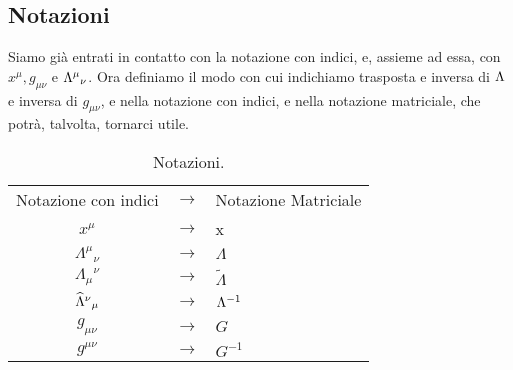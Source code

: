 \subsection{Notazioni}
Siamo gi\`a entrati in contatto con la notazione con indici, e,
assieme ad essa, con $x^{\mu},g_{\mu\nu}$ e $\Lambda^{\mu}{}_{\nu}$.
Ora definiamo il modo con cui indichiamo trasposta e inversa di $\Lambda$
e inversa di $g_{\mu\nu}$, e nella notazione con indici, e nella
notazione matriciale, che potr\`a, talvolta, tornarci utile.

\begin{table}[htbp]
\begin{center}
\begin{tabular}{ccl}
Notazione con indici &$\longrightarrow$& Notazione Matriciale \\
$x^{\mu}$ &$\longrightarrow$& x \\
$\Lambda^{\mu}{}_{\nu}$ &$\longrightarrow$& $\Lambda $\\
$\Lambda_{\mu}{}^{\nu}$ &$\longrightarrow$& $\widetilde{\Lambda}$\\
$\widehat{\Lambda}^{\nu}{}_{\mu}$ &$\longrightarrow$& $\Lambda^{-1}$\\
$g_{\mu \nu}$ &$\longrightarrow$& $G$\\
$g^{\mu\nu}$ &$\longrightarrow$& $G^{-1}$
\end{tabular}
\end{center}
\label{tab:notazioni}\caption{Notazioni.}
\end{table}

